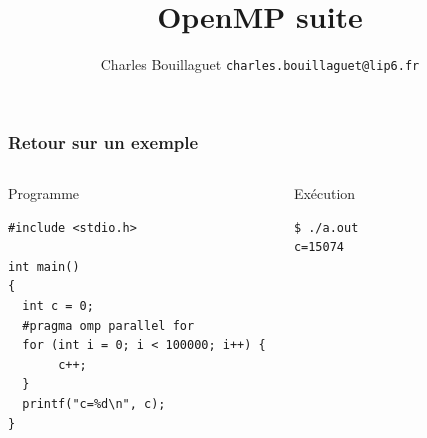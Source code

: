 \documentclass[xcolor={x11names,svgnames},x11names,svgnames]{beamer}
\author[C.~Bouillaguet]{Charles Bouillaguet \newline
  {\small \texttt{charles.bouillaguet@lip6.fr}}}
\title{OpenMP suite}
\begin{document}
\begin{frame}
  \titlepage
\end{frame}


\begin{frame}[fragile]
  \frametitle{Retour sur un exemple}

  \begin{columns}[t]
  \column{5.5cm}
\begin{block}{Programme}
\begin{verbatim}
#include <stdio.h>
  
int main()
{
  int c = 0;
  #pragma omp parallel for
  for (int i = 0; i < 100000; i++) { 
       c++; 
  }
  printf("c=%d\n", c);
}
\end{verbatim}
\end{block}
    
    
    \column{4.5cm}
\begin{block}{Exécution}    
\footnotesize
\begin{verbatim}
$ ./a.out
c=15074
\end{verbatim}
\end{block}    
  \end{columns}
\end{frame}
\end{document}
